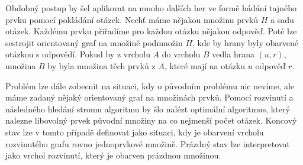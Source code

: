 Obdobný postup by šel aplikovat na mnoho dalších her ve formě hádání tajného prvku pomocí pokládání otázek. Nechť máme nějakou množinu prvků $H$ a sadu otázek. Každému prvku přiřadíme pro každou otázku nějakou odpověď. Poté lze sestrojit orientovaný graf na množině podmnožin $H$, kde by hrany byly obarvené otázkou s odpovědí. Pokud by z vrcholu $A$ do vrcholu $B$ vedla hrana $(u,r)$, množina $B$ by byla množina těch prvků z $A$, které mají na otázku $u$ odpověď $r$. 

Problém lze dále zobecnit na situaci, kdy o původním problému nic nevíme, ale máme zadaný nějaký orientovaný graf na množinách prvků. Pomocí rozvinutí a následného hledání stromu algoritmu by šlo nalézt optimální algoritmus, který nalezne libovolný prvek původní množiny na co nejmenší počet otázek. Koncový stav lze v tomto případě definovat jako situaci, kdy je obarvení vrcholu rozvinutého grafu rovno jednoprvkové množině. Prázdný stav lze interpretovat jako vrchol rozvinutí, který je obarven prázdnou množinou. 








